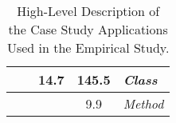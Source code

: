 \begin{center}
\begin{table}[h]
\begin{center}
\begin{tabular}{r | c | c | c | l}
         &                 & 14.7          & 145.5        & {\em Class}
\\ \hline

         &                 &               & 9.9          & {\em Method} \\

\end{tabular}

\end{center}

\vspace*{.1in}

\caption{High-Level Description of the Case Study Applications Used in the Empirical Study.}

\vspace*{-.35in}

\label{fig:characterize_second}

\end{table}
\end{center}



